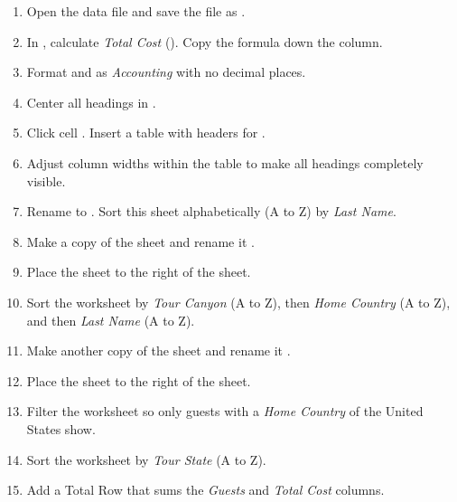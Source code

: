 \begin{enumbox}
	\begin{enumerate}
		\item Open the data file  and save the file as .
		\item In , calculate \textit{Total Cost} (). Copy the formula down the column.
		\item Format  and  as \textit{Accounting} with no decimal places.
		\item Center all headings in .
		\item Click cell . Insert a table with headers for .
		\item Adjust column widths within the table to make all headings completely visible.
		\item Rename  to . Sort this sheet alphabetically (A to Z) by \textit{Last Name}.
	
		\item Make a copy of the  sheet and rename it .
		\item Place the  sheet to the right of the  sheet.
		\item Sort the  worksheet by \textit{Tour Canyon} (A to Z), then \textit{Home Country} (A to Z), and then \textit{Last Name} (A to Z).
	
		\item Make another copy of the  sheet and rename it .
		\item Place the  sheet to the right of the  sheet.
		\item Filter the  worksheet so only guests with a \textit{Home Country} of the United States show. 
		\item Sort the worksheet by \textit{Tour State} (A to Z).
		\item Add a Total Row that sums the \textit{Guests} and \textit{Total Cost} columns.
	

\end{enumerate}
\end{enumbox}
